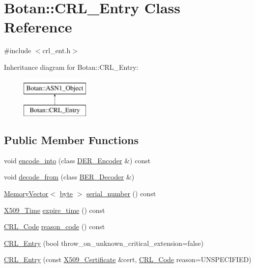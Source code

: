 \hypertarget{classBotan_1_1CRL__Entry}{\section{Botan\-:\-:C\-R\-L\-\_\-\-Entry Class Reference}
\label{classBotan_1_1CRL__Entry}
}


{\ttfamily \#include $<$crl\-\_\-ent.\-h$>$}

Inheritance diagram for Botan\-:\-:C\-R\-L\-\_\-\-Entry\-:\begin{figure}[H]
\begin{center}
\leavevmode
\includegraphics[height=2.000000cm]{classBotan_1_1CRL__Entry}
\end{center}
\end{figure}
\subsection*{Public Member Functions}
\begin{DoxyCompactItemize}
\item 
void \hyperlink{classBotan_1_1CRL__Entry_a835afe98b6452304a351569dd2bd22f8}{encode\-\_\-into} (class \hyperlink{classBotan_1_1DER__Encoder}{D\-E\-R\-\_\-\-Encoder} \&) const 
\item 
void \hyperlink{classBotan_1_1CRL__Entry_af201fbbddb07502b6e065ad181983a8f}{decode\-\_\-from} (class \hyperlink{classBotan_1_1BER__Decoder}{B\-E\-R\-\_\-\-Decoder} \&)
\item 
\hyperlink{classBotan_1_1MemoryVector}{Memory\-Vector}$<$ \hyperlink{namespaceBotan_a7d793989d801281df48c6b19616b8b84}{byte} $>$ \hyperlink{classBotan_1_1CRL__Entry_a03c823da8e978f9af236877030fd219b}{serial\-\_\-number} () const 
\item 
\hyperlink{classBotan_1_1X509__Time}{X509\-\_\-\-Time} \hyperlink{classBotan_1_1CRL__Entry_a1e4a55019e9bdcef4bf2b16acbed1a84}{expire\-\_\-time} () const 
\item 
\hyperlink{namespaceBotan_a781d47b68b281fe5b934138d13de2dfc}{C\-R\-L\-\_\-\-Code} \hyperlink{classBotan_1_1CRL__Entry_a176cf916d49e913503efdb18c1a95732}{reason\-\_\-code} () const 
\item 
\hyperlink{classBotan_1_1CRL__Entry_a764c4d0db834d9d5d3307a907119b30a}{C\-R\-L\-\_\-\-Entry} (bool throw\-\_\-on\-\_\-unknown\-\_\-critical\-\_\-extension=false)
\item 
\hyperlink{classBotan_1_1CRL__Entry_a7ebd9186552e3d40ed747567d5ee60e8}{C\-R\-L\-\_\-\-Entry} (const \hyperlink{classBotan_1_1X509__Certificate}{X509\-\_\-\-Certificate} \&cert, \hyperlink{namespaceBotan_a781d47b68b281fe5b934138d13de2dfc}{C\-R\-L\-\_\-\-Code} reason=U\-N\-S\-P\-E\-C\-I\-F\-I\-E\-D)
\end{DoxyCompactItemize}


